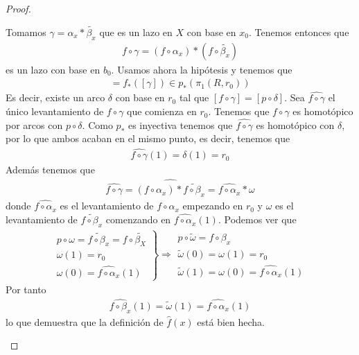 \begin{teo}
\begin{proof}
\begin{itemize}
            Tomamos $\gamma=\alpha_x \ast \tilde{\beta_x}$ que es un lazo en $X$ con base en $x_0$. Tenemos entonces que 
            \begin{gather*}
                f \circ \gamma = (f\circ \alpha_x) \ast (f \circ \tilde{\beta_x})
            \end{gather*}
            es un lazo con base en $b_0$. Usamos ahora la hipótesis y tenemos que 
            \begin{gather*}
                [f\circ \gamma] = f_*([\gamma]) \in p_*(\pi_1(R, r_0))
            \end{gather*}
            Es decir, existe un arco $\delta$ con base en $r_0$ tal que $[f\circ \gamma] = [p\circ \delta]$. Sea $\widehat{f\circ \gamma}$ el único levantamiento de $f\circ \gamma$ que comienza en $r_0$. Tenemos que $f\circ \gamma$ es homotópico por arcos con $p\circ \delta$. Como $p_*$ es inyectiva tenemos que $\widehat{f\circ \gamma}$ es homotópico con $\delta$, por lo que ambos acaban en el mismo punto, es decir, tenemos que 
            \begin{gather*}
                \widehat{f\circ \gamma}(1) = \delta(1) = r_0
            \end{gather*}
            Además tenemos que 
            \begin{gather*}
                \widehat{f\circ \gamma} = \widehat{(f\circ \alpha_x) \ast \tilde{f\circ \beta_x}} = \widehat{f\circ \alpha_x} \ast \omega
            \end{gather*}
            donde $\widehat{f \circ \alpha_x}$ es el levantamiento de $f\circ \alpha_x$ empezando en $r_0$ y $\omega$ es el levantamiento de $\tilde{f\circ \beta_x}$ comenzando en $\widehat{f\circ \alpha_x}(1)$. Podemos ver que 
            \begin{gather*}
                 \left.
                \begin{array}{c}
                    p\circ \omega = \tilde{f\circ \beta_x} = f\circ \tilde{\beta_X}\\
                    \omega(1) = r_0\\
                    \omega(0) = \widehat{f\circ \alpha_x}(1)
                \end{array}
                \right\} \Rightarrow
                \begin{array}{c}
                    p\circ \tilde{\omega} = f\circ \beta_x\\
                    \tilde{\omega}(0) = \omega(1) = r_0\\
                    \tilde{\omega}(1) = \omega(0) = \widehat{f\circ \alpha_x}(1)
                \end{array}
            \end{gather*}
            Por tanto
            \begin{gather*}
                \widehat{f\circ \beta_x}(1) = \tilde{\omega}(1)=\widehat{f\circ \alpha_x}(1)
            \end{gather*}
            lo que demuestra que la definición de $\hat{f}(x)$ está bien hecha.\\


\end{itemize}
\end{proof}
\end{teo}
